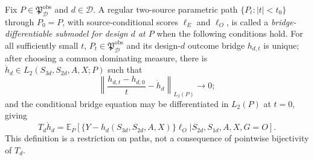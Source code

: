Fix \(P\in\mathfrak P_{\mathcal D}^{\mathrm{obs}}\) and \(d\in\mathcal D\).  A regular two-source parametric path \(\{P_t:|t|<t_0\}\) through \(P_0=P\), with source-conditional scores \(\ell_E\) and \(\ell_O\), is called a \emph{bridge-differentiable submodel for design \(d\) at \(P\)} when the following conditions hold.  For all sufficiently small \(t\), \(P_t\in\mathfrak P_{\mathcal D}^{\mathrm{obs}}\) and its design-\(d\) outcome bridge \(h_{d,t}\) is unique; after choosing a common dominating measure, there is \(\dot h_d\in L_2(S_{3d},S_{2d},A,X;P)\) such that
\[
 \left\|\frac{h_{d,t}-h_{d,0}}{t}-\dot h_d\right\|_{L_2(P)}\longrightarrow0;
\]
and the conditional bridge equation may be differentiated in \(L_2(P)\) at \(t=0\), giving
\[
 T_d\dot h_d
 =\mathbb E_P\!\left[
 \{Y-h_d(S_{3d},S_{2d},A,X)\}\ell_O
 \mathrel{\Big|}S_{2d},S_{1d},A,X,G=O
 \right].
\]
This definition is a restriction on paths, not a consequence of pointwise bijectivity of \(T_d\).